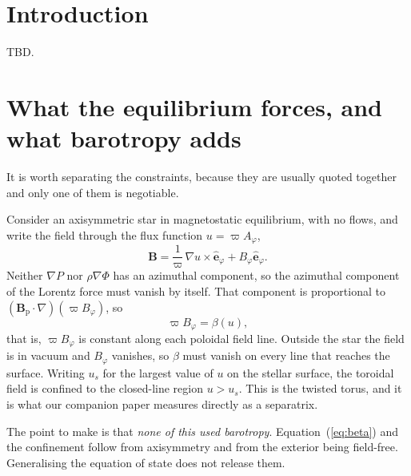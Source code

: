 \documentclass{aa}
\begin{document}

   \maketitle


\section{Introduction}

TBD.


\section{What the equilibrium forces, and what barotropy adds}
\label{sec:forced}

It is worth separating the constraints, because they are usually quoted
together and only one of them is negotiable.

Consider an axisymmetric star in magnetostatic equilibrium, with no
flows, and write the field through the flux function $u = \varpi
A_\varphi$,
\begin{equation}
\mathbf{B} = \frac{1}{\varpi}\,\nabla u \times
             \hat{\mathbf{e}}_\varphi
             + B_\varphi \hat{\mathbf{e}}_\varphi .
\label{eq:decomposition}
\end{equation}
Neither $\nabla P$ nor $\rho\nabla\Phi$ has an azimuthal component, so
the azimuthal component of the Lorentz force must vanish by itself. That
component is proportional to
$(\mathbf{B}_{\mathrm{p}}\cdot\nabla)(\varpi B_\varphi)$, so
\begin{equation}
\varpi B_\varphi = \beta(u),
\label{eq:beta}
\end{equation}
that is, $\varpi B_\varphi$ is constant along each poloidal field line.
Outside the star the field is in vacuum and $B_\varphi$ vanishes, so
$\beta$ must vanish on every line that reaches the surface. Writing
$u_s$ for the largest value of $u$ on the stellar surface, the toroidal
field is confined to the closed-line region $u > u_s$. This is the
twisted torus, and it is what our companion paper measures directly as a
separatrix.

The point to make is that \emph{none of this used barotropy}.
Equation~(\ref{eq:beta}) and the confinement follow from axisymmetry and
from the exterior being field-free. Generalising the equation of state
does not release them.
\end{document}
